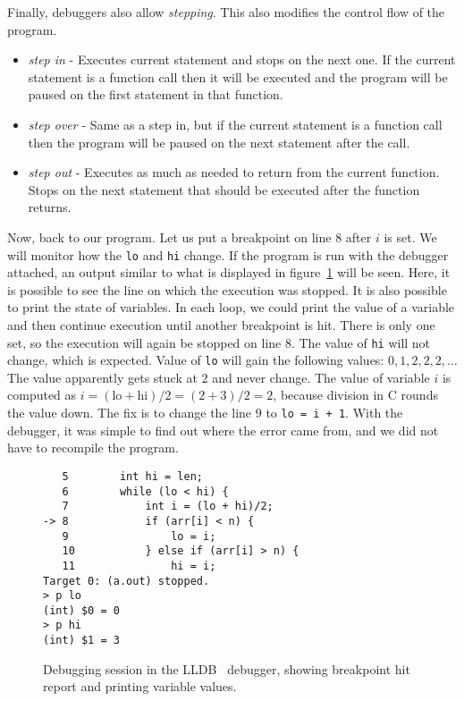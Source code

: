 Finally, debuggers also allow \textit{stepping}. This also modifies the control
flow of the program.
\begin{itemize}
    \item \textit{step in} - Executes current statement and stops on the next
        one. If the current statement is a function call then it will be
        executed and the program will be paused on the first statement in that
        function.
    \item \textit{step over} - Same as a step in, but if the current statement
        is a function call then the program will be paused on the next
        statement after the call.
    \item \textit{step out} -  Executes as much as needed to return from the
        current function. Stops on the next statement that should be executed
        after the function returns.
\end{itemize}

Now, back to our program. Let us put a breakpoint on line $8$ after $i$ is set.
We will monitor how the \texttt{lo} and \texttt{hi} change. If the program is
run with the debugger attached, an output similar to what is displayed in
figure~\ref{fig:lldb-debug1} will be seen. Here, it is possible to see the line
on which the execution was stopped. It is also possible to print the state of
variables. In each loop, we could print the value of a variable and then
continue execution until another breakpoint is hit. There is only one set, so
the execution will again be stopped on line $8$. The value of \texttt{hi} will
not change, which is expected. Value of \texttt{lo} will gain the following
values: $0, 1, 2, 2, 2, \dots$ The value apparently gets stuck at $2$ and never
change. The value of variable $i$ is computed as $i = (\text{lo} + \text{hi})/2
= (2 + 3)/2 = 2$, because division in C rounds the value down. The fix is to
change the line $9$ to \texttt{lo = i + 1}. With the debugger, it was simple to
find out where the error came from, and we did not have to recompile the
program.

\begin{figure}
\begin{verbatim}
   5   	    int hi = len;
   6   	    while (lo < hi) {
   7   	        int i = (lo + hi)/2;
-> 8   	        if (arr[i] < n) {
   9   	            lo = i;
   10  	        } else if (arr[i] > n) {
   11  	            hi = i;
Target 0: (a.out) stopped.
> p lo
(int) $0 = 0
> p hi
(int) $1 = 3
\end{verbatim}
    \caption{Debugging session in the LLDB~\cite{lldb} debugger, showing
    breakpoint hit report and printing variable values.}
    \label{fig:lldb-debug1}
\end{figure}

